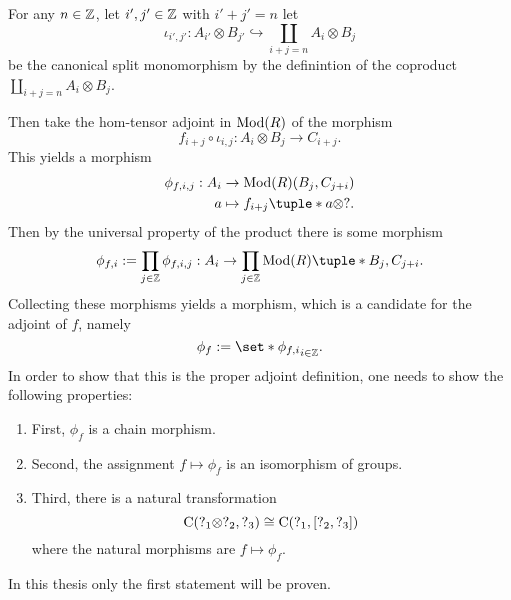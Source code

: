 \begin{remark}
\begin{center}
    \end{center}

    For any \( n \in {\mathbb{Z}} \), let \( i', j' \in {\mathbb{Z}} \) with \( i' + j' = n \) let
    \[
        \iota_{i', j'}: A_{i'} \otimes B_{j'} \hookrightarrow \coprod_{i + j = n} A_i \otimes B_j
    \]
    be the canonical split monomorphism by the definintion of the coproduct \( \coprod_{i + j = n} A_i \otimes B_j \).

    Then take the hom-tensor adjoint in \( \operatorname{Mod}(R) \) of the morphism
    \[
        f_{i + j} \circ \iota_{i, j}: A_i \otimes B_j \to C_{i + j}.
    \]
    This yields a morphism
    \begin{align*}
        \phi_{f, i, j}: A_i &\to \Mod(R)(B_j, C_{j + i}) \\
        a &\mapsto f_{i + j}\tuple*{ a \otimes ? }.
    \end{align*}
    Then by the universal property of the product there is some morphism
    \[
        \phi_{f, i} := \prod_{j \in \Zb} \phi_{f, i, j}: A_i \to \prod_{j \in \Zb} \Mod(R)\tuple*{B_j, C_{j + i}}.
    \]
    Collecting these morphisms yields a morphism, which is a candidate for the adjoint of \( f \), namely
    \[
        \phi_f := \set*{\phi_{f, i}}_{i \in \Zb}.
    \]
    In order to show that this is the proper adjoint definition, one needs to show the following properties:
    \begin{enumerate}
        \item {
            First, \( \phi_f \) is a chain morphism.
        }
        \item {
            Second, the assignment \( f \mapsto \phi_f \) is an isomorphism of groups.
        }
        \item {
            Third, there is a natural transformation
            \[
                \operatorname{C}(?_1 \otimes ?_2, ?_3) \cong \operatorname{C}(?_1, \left[ ?_2, ?_3 \right])
            \]
            where the natural morphisms are \( f \mapsto \phi_f \).
        }
    \end{enumerate}
    In this thesis only the first statement will be proven.


\end{remark}
